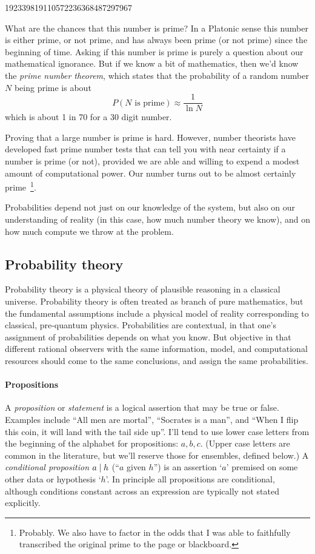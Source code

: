 \documentclass[Lectures.tex]{subfiles}
\begin{document}
\begin{center}
192339819110572236368487297967
\end{center}

What are the chances that this number is prime? In a Platonic sense this number is either prime, or not prime, and has always been prime (or not prime) since the beginning of time. Asking if this number is prime is purely a question about our mathematical ignorance.  But if we know a bit of mathematics, then we'd know the {\sl prime number theorem}, which states that the probability of a random number $N$ being prime is about
\[
	P(N\text{ is prime}) \approx \frac{1}{\ln N}
\]
which is about 1 in 70 for a 30 digit number. 

Proving that a large number is prime is hard. However, number theorists have developed fast prime number tests that can tell you with near certainty if a number is prime (or not), provided we are able and willing to expend a modest amount of computational power. Our number turns out to be almost certainly prime~\footnote{Probably. We also have to factor in the odds that I was able to faithfully transcribed the original prime to the page or blackboard.}.

Probabilities depend not just on our knowledge of the system, but also on our understanding of reality (in this case, how much number theory we know), and on how much compute we throw at the problem. 



\subsection{Probability theory}

Probability theory is a physical theory of plausible reasoning in a classical universe. Probability theory is often treated as  branch of pure mathematics, but the fundamental assumptions include a physical model of reality corresponding to classical, pre-quantum physics. Probabilities are contextual, in that one's assignment of probabilities depends on what you know. But objective in that different rational observers with the same information, model, and computational resources should come to the same conclusions, and assign the same probabilities.

\paragraph{Propositions}
A {\sl proposition} or {\sl statement} is a logical assertion that may be true or false. Examples include ``All men are mortal'', ``Socrates is a man'', and ``When I flip this coin, it will land with the tail side up''.  I'll tend to use lower case letters from the beginning of the alphabet for propositions: $a,b,c$. (Upper case letters are common in the literature, but we'll reserve those for ensembles, defined below.)  A {\sl conditional proposition}
 $a\mathrel{\vert} h$ (``$a$ given $h$'') is an assertion `$a$' premised on some other data or hypothesis `$h$'. In principle all propositions are conditional, although conditions constant across an expression are typically not stated explicitly.
\end{document}
